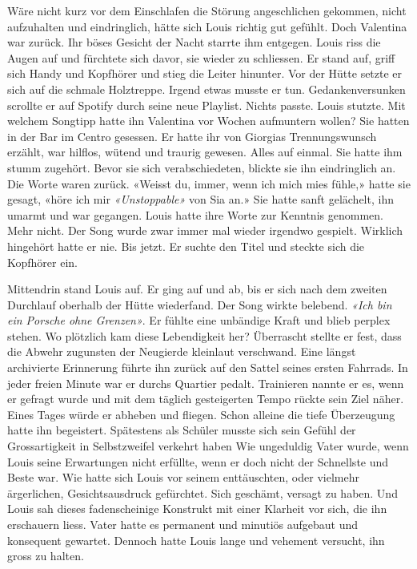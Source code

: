 Wäre nicht kurz vor dem Einschlafen die Störung angeschlichen gekommen,
nicht aufzuhalten und eindringlich, hätte sich Louis richtig gut gefühlt.
Doch Valentina war zurück. Ihr böses Gesicht der Nacht starrte ihm
entgegen. Louis riss die Augen auf und fürchtete sich davor, sie wieder
zu schliessen. 
Er stand auf, griff sich Handy und Kopfhörer und stieg die Leiter 
hinunter. Vor der Hütte setzte er sich auf die schmale Holztreppe.
Irgend etwas musste er tun. Gedankenversunken scrollte er auf Spotify durch seine neue Playlist.
Nichts passte.
Louis stutzte. Mit welchem Songtipp hatte ihn Valentina vor Wochen aufmuntern wollen? 
Sie hatten in der Bar im Centro gesessen. Er hatte ihr von Giorgias Trennungswunsch erzählt, war
hilflos, wütend und traurig gewesen. Alles auf einmal. Sie hatte ihm stumm zugehört. Bevor sie sich verabschiedeten, blickte sie ihn eindringlich an. Die Worte waren zurück.
«Weisst du, immer, wenn ich mich mies fühle,» hatte sie gesagt, «höre ich mir \emph{«Unstoppable»} von Sia an.»
Sie hatte sanft gelächelt, ihn umarmt und war gegangen. Louis hatte ihre Worte zur Kenntnis genommen. Mehr nicht. Der Song wurde zwar immer mal wieder irgendwo gespielt. Wirklich hingehört hatte er nie. Bis jetzt. Er suchte den Titel und steckte sich die Kopfhörer ein.


Mittendrin stand Louis auf. Er ging auf und ab, bis er sich nach dem
zweiten Durchlauf oberhalb der Hütte wiederfand. Der Song wirkte belebend.
\emph{«Ich bin ein Porsche ohne Grenzen»}. Er fühlte eine unbändige Kraft und blieb perplex stehen. Wo plötzlich kam diese Lebendigkeit her?
Überrascht stellte er fest, dass die Abwehr zugunsten der Neugierde kleinlaut verschwand. Eine längst archivierte Erinnerung führte ihn zurück auf den Sattel seines ersten Fahrrads. In jeder freien Minute war er durchs Quartier pedalt. Trainieren nannte er es, wenn er gefragt wurde und mit dem täglich gesteigerten Tempo rückte sein Ziel näher. Eines Tages würde er abheben und fliegen. Schon alleine die tiefe Überzeugung hatte ihn begeistert.
Spätestens als Schüler musste sich sein Gefühl der Grossartigkeit in Selbstzweifel verkehrt haben Wie ungeduldig Vater wurde, wenn Louis seine Erwartungen nicht erfüllte, wenn er doch nicht der Schnellste und Beste war. Wie hatte sich Louis vor seinem enttäuschten, oder vielmehr ärgerlichen, Gesichtsausdruck gefürchtet. Sich geschämt, versagt zu haben. Und Louis sah dieses fadenscheinige Konstrukt mit einer Klarheit vor sich, die ihn erschauern liess. Vater hatte es permanent und minutiös aufgebaut und konsequent gewartet. Dennoch hatte Louis lange und vehement versucht, ihn gross zu halten.

